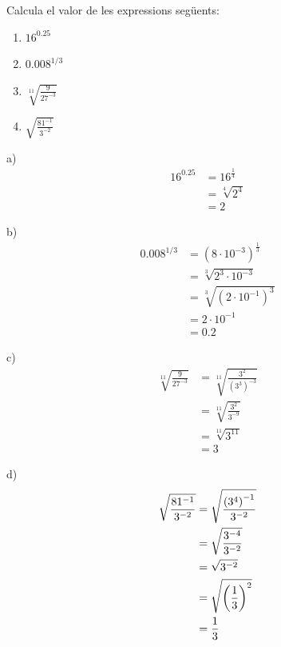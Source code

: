\begin{exercici}
Calcula el valor de les expressions següents:

\begin{enumerate}
\item[a)] $16^{0.25}$

\item[b)] $0.008^{1/3}$

\item[c)] $\sqrt[11]{\frac{9}{27^{-3}}}$

\item[d)] $\sqrt{\frac{81^{-1}}{3^{-2}}}$
\end{enumerate}

\end{exercici}

\begin{solucio}
a)%
\begin{align*}
16^{0.25} &=16^{\frac{1}{4}} \\
&=\sqrt[4]{2^{4}} \\
&=2
\end{align*}

b)%
\begin{align*}
0.008^{1/3} &=\left( 8\cdot 10^{-3}\right) ^{\frac{1}{3}} \\
&=\sqrt[3]{2^{3}\cdot 10^{-3}} \\
&=\sqrt[3]{\left( 2\cdot 10^{-1}\right) ^{3}} \\
&=2\cdot 10^{-1} \\
&=0.2
\end{align*}

c)%
\begin{align*}
\sqrt[11]{\frac{9}{27^{-3}}} &=\sqrt[11]{\frac{3^{2}}{\left( 3^{3}\right)
^{-3}}} \\
&=\sqrt[11]{\frac{3^{2}}{3^{-9}}} \\
&=\sqrt[11]{3^{11}} \\
&=3
\end{align*}

d)%
\begin{align*}
\sqrt{\frac{81^{-1}}{3^{-2}}} &=\sqrt{\frac{\left( 3^{4}\right) ^{-1}}{%
3^{-2}}} \\
&=\sqrt{\frac{3^{-4}}{3^{-2}}} \\
&=\sqrt{3^{-2}} \\
&=\sqrt{\left( \frac{1}{3}\right) ^{2}} \\
&=\frac{1}{3}
\end{align*}
\end{solucio}

